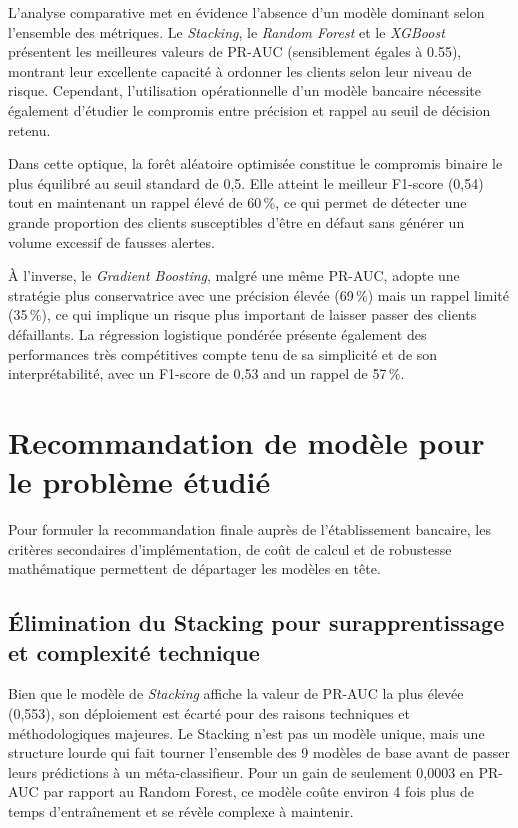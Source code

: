 \documentclass{article}
\begin{document}
L'analyse comparative met en évidence l'absence d'un modèle dominant selon l'ensemble des métriques. Le \textit{Stacking}, le \textit{Random Forest} et le \textit{XGBoost} présentent les meilleures valeurs de PR-AUC (sensiblement égales à 0.55), montrant leur excellente capacité à ordonner les clients selon leur niveau de risque. Cependant, l'utilisation opérationnelle d'un modèle bancaire nécessite également d'étudier le compromis entre précision et rappel au seuil de décision retenu.

Dans cette optique, la forêt aléatoire optimisée constitue le compromis binaire le plus équilibré au seuil standard de 0,5. Elle atteint le meilleur F1-score (0,54) tout en maintenant un rappel élevé de 60\,\%, ce qui permet de détecter une grande proportion des clients susceptibles d'être en défaut sans générer un volume excessif de fausses alertes.

À l'inverse, le \textit{Gradient Boosting}, malgré une même PR-AUC, adopte une stratégie plus conservatrice avec une précision élevée (69\,\%) mais un rappel limité (35\,\%), ce qui implique un risque plus important de laisser passer des clients défaillants. La régression logistique pondérée présente également des performances très compétitives compte tenu de sa simplicité et de son interprétabilité, avec un F1-score de 0,53 and un rappel de 57\,\%.

\section{Recommandation de modèle pour le problème étudié}

Pour formuler la recommandation finale auprès de l'établissement bancaire, les critères secondaires d'implémentation, de coût de calcul et de robustesse mathématique permettent de départager les modèles en tête.

\subsection{Élimination du Stacking pour surapprentissage et complexité technique}
Bien que le modèle de \textit{Stacking} affiche la valeur de PR-AUC la plus élevée (0,553), son déploiement est écarté pour des raisons techniques et méthodologiques majeures. Le Stacking n'est pas un modèle unique, mais une structure lourde qui fait tourner l'ensemble des 9 modèles de base avant de passer leurs prédictions à un méta-classifieur. Pour un gain de seulement 0,0003 en PR-AUC par rapport au Random Forest, ce modèle coûte environ 4 fois plus de temps d'entraînement et se révèle complexe à maintenir.
\end{document}
